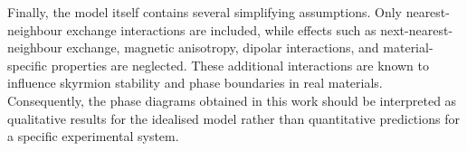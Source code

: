 Finally, the model itself contains several simplifying assumptions. Only nearest-neighbour exchange interactions are included, while effects such as next-nearest-neighbour exchange, magnetic anisotropy, dipolar interactions, and material-specific properties are neglected. These additional interactions are known to influence skyrmion stability and phase boundaries in real materials. Consequently, the phase diagrams obtained in this work should be interpreted as qualitative results for the idealised model rather than quantitative predictions for a specific experimental system.
